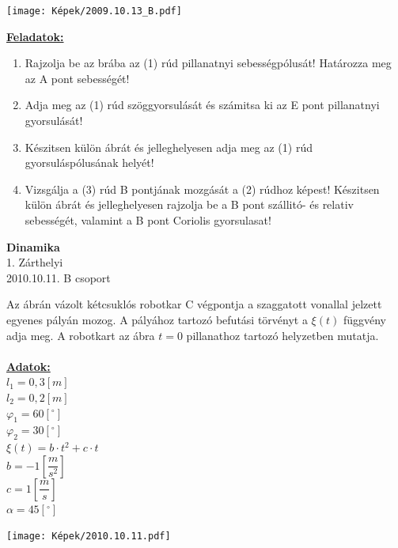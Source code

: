 \documentclass[11pt,a4paper]{article}
\begin{document}
\begin{center}
    \texttt{[image: Képek/2009.10.13\_B.pdf]}
\end{center}

\vspace{2em}
\underline{\textbf{Feladatok:}}
\begin{enumerate}
    \item Rajzolja be az brába az (1) rúd pillanatnyi sebességpólusát! Határozza meg az A pont
    sebességét!
    \item Adja meg az (1) rúd szöggyorsulását és számitsa ki az E pont pillanatnyi gyorsulását!
    \item Készitsen külön ábrát és jelleghelyesen adja meg az (1) rúd gyorsuláspólusának helyét!
    \item Vizsgálja a (3) rúd B pontjának mozgását a (2) rúdhoz képest! Készitsen külön ábrát és
    jelleghelyesen rajzolja be a B pont szállitó- és relativ sebességét, valamint a B pont Coriolis gyorsulasat!
\end{enumerate}
\newpage

\begin{center}
    \textbf{\LARGE{Dinamika}}\\
    1. Zárthelyi\\
    2010.10.11. B csoport
\end{center}
Az ábrán vázolt kétcsuklós robotkar C végpontja a szaggatott vonallal jelzett egyenes pályán mozog. A pályához tartozó befutási törvényt a \(\xi(t)\) függvény adja meg. A robotkart az ábra \(t = 0\) pillanathoz tartozó helyzetben mutatja.\\\\
\underline{\textbf{Adatok:}}\\
$l_1 = 0,3 [m]$\\
$l_2 = 0,2 [m]$\\
$\varphi_1 = 60 [^\circ]$\\
$\varphi_2 = 30 [^\circ]$\\
$\xi(t) = b \cdot t^2 + c \cdot t$\\
$b = -1 \left[\dfrac{m}{s^2}\right]$\\
$c = 1 \left[\dfrac{m}{s}\right]$\\
$\alpha = 45 [^\circ]$
\begin{center}
    \texttt{[image: Képek/2010.10.11.pdf]}
\end{center}
\end{document}
